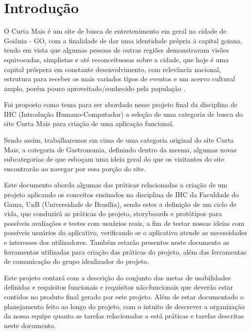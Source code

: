 \chapter[Introdução]{Introdução}

O Curta Mais é um site de busca de entretenimento em geral na cidade de Goiânia - GO, com a finalidade de dar uma identidade própria à capital goiana, tendo em vista  que algumas pessoas de outras regiões demonstravam visões equivocadas, simplistas e até reconceituosas sobre a cidade, que hoje é uma capital próspera em constante desenvolvimento, com relevância nacional, estrutura para receber os mais variados tipos de eventos e um acervo cultural amplo, porém pouco aproveitado/conhecido pela população \cite{curtamais}.

Foi proposto como tema para ser abordado nesse projeto final da disciplina de IHC (Introdução Humano-Computador) a seleção de uma categoria de busca do site Curta Mais para criação de uma aplicação funcional. 

Sendo assim, trabalharemos em cima de uma categoria original do site Curta Mais, a categoria de Gastronomia, definindo dentro da mesma, algumas novas subcategorias de que esboçam uma ideia geral do que os visitantes do site encontrarão ao navegar por essa porção do site. 

Este documento aborda algumas das práticas relacionadas a criação de um projeto aplicando os conceitos ensinados na disciplina de IHC da Faculdade do Gama, UnB (Universidade de Brasília), sendo estes a definição de um ciclo de vida, que conduzirá as práticas do projeto, storyboards e protótipos para possíveis avaliações e testes com usuários reais, a fim de testar nossas ideias com possíveis usuários do aplicativo, verificando se o aplicativo atende as necessidades e interesses dos utilizadores. Também estarão presentes neste documento as ferramentas utilizadas  para criação das práticas do projeto, além das ferramentas de comunicação do grupo idealizador do projeto.

Este projeto contará com a descrição do conjunto das metas de usabilidades definidas e requisitos funcionais e requisitos não-funcionais que deverão estar contidos no produto final gerado por este projeto. Além de estar documentado o planejamento feito ao longo do projeto, com o intuito de descrever a organização da nossa equipe quanto as tarefas relacionadas a está práticas e tarefas descritas neste documento.
